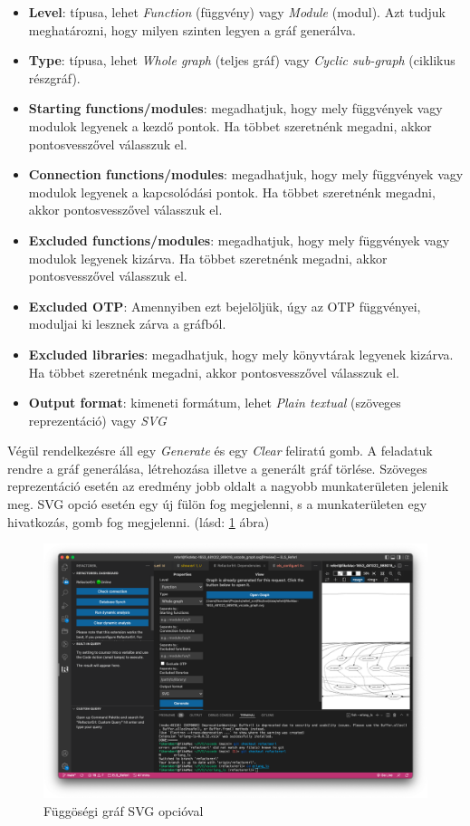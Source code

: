 \begin{itemize}
    \item \textbf{Level}: típusa, lehet \textit{Function} (függvény) vagy \textit{Module} (modul). Azt tudjuk meghatározni, hogy milyen szinten legyen a gráf generálva.
     \item \textbf{Type}: típusa, lehet \textit{Whole graph} (teljes gráf) vagy \textit{Cyclic sub-graph} (ciklikus részgráf).
     \item \textbf{Starting functions/modules}: megadhatjuk, hogy mely függvények vagy modulok legyenek a kezdő pontok. Ha többet szeretnénk megadni, akkor pontosvesszővel válasszuk el.
     \item \textbf{Connection functions/modules}: megadhatjuk, hogy mely függvények vagy modulok legyenek a kapcsolódási pontok. Ha többet szeretnénk megadni, akkor pontosvesszővel válasszuk el.
     \item \textbf{Excluded functions/modules}: megadhatjuk, hogy mely függvények vagy modulok legyenek kizárva. Ha többet szeretnénk megadni, akkor pontosvesszővel válasszuk el.
     \item \textbf{Excluded OTP}: Amennyiben ezt bejelöljük, úgy az OTP függvényei, moduljai ki lesznek zárva a gráfból.
     \item \textbf{Excluded libraries}: megadhatjuk, hogy mely könyvtárak legyenek kizárva. Ha többet szeretnénk megadni, akkor pontosvesszővel válasszuk el.
     \item \textbf{Output format}: kimeneti formátum, lehet \textit{Plain textual} (szöveges reprezentáció) vagy \textit{SVG} 
\end{itemize}

Végül rendelkezésre áll egy \textit{Generate} és egy \textit{Clear} feliratú gomb. A feladatuk rendre a gráf generálása, létrehozása illetve a generált gráf törlése. Szöveges reprezentáció esetén az eredmény jobb oldalt a nagyobb munkaterületen jelenik meg. SVG opció esetén egy új fülön fog megjelenni, s a munkaterületen egy hivatkozás, gomb fog megjelenni. (lásd: \ref{fig:depGraphSVG} ábra)

\begin{figure}[H]
  \centering
  \includegraphics[width=\linewidth]{images/svg_graph.png}
  \caption{Függöségi gráf SVG opcióval}
  \label{fig:depGraphSVG}
\end{figure}

